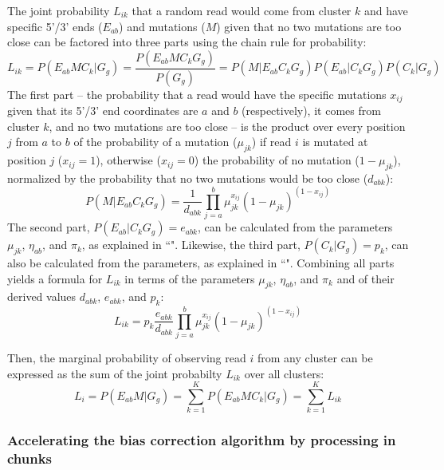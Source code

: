 \documentclass{article}
\begin{document}
The joint probability $L_{ik}$ that a random read would come from cluster $k$ and have specific 5'/3' ends ($E_{ab}$) and mutations ($M$) given that no two mutations are too close can be factored into three parts using the chain rule for probability:
\begin{equation}
    L_{ik} = P(E_{ab} M C_k | G_g) = \frac{P(E_{ab} M C_k G_g)}{P(G_g)} = P(M | E_{ab} C_k G_g) P(E_{ab} | C_k G_g) P(C_k | G_g)
\end{equation}
The first part -- the probability that a read would have the specific mutations $x_{ij}$ given that its 5'/3' end coordinates are $a$ and $b$ (respectively), it comes from cluster $k$, and no two mutations are too close -- is the product over every position $j$ from $a$ to $b$ of the probability of a mutation ($\mu_{jk}$) if read $i$ is mutated at position $j$ ($x_{ij} = 1$), otherwise ($x_{ij} = 0$) the probability of no mutation ($1 - \mu_{jk}$), normalized by the probability that no two mutations would be too close ($d_{abk}$):
\begin{equation}
    P(M | E_{ab} C_k G_g) = \frac{1}{d_{abk}} \prod_{j=a}^{b} \mu_{jk}^{x_{ij}} (1 - \mu_{jk})^{(1 - x_{ij})}
\end{equation}
The second part, $P(E_{ab} | C_k G_g) = e_{abk}$, can be calculated from the parameters $\mu_{jk}$, $\eta_{ab}$, and $\pi_k$, as explained in ``".
Likewise, the third part, $P(C_k | G_g) = p_k$, can also be calculated from the parameters, as explained in ``".
Combining all parts yields a formula for $L_{ik}$ in terms of the parameters $\mu_{jk}$, $\eta_{ab}$, and $\pi_k$ and of their derived values $d_{abk}$, $e_{abk}$, and $p_k$:
\begin{equation}
    L_{ik} = p_k \frac{e_{abk}}{d_{abk}} \prod_{j=a}^{b} \mu_{jk}^{x_{ij}} (1 - \mu_{jk})^{(1 - x_{ij})}
\end{equation}

Then, the marginal probability of observing read $i$ from any cluster can be expressed as the sum of the joint probabilty $L_{ik}$ over all clusters:
\begin{equation}
    L_i = P(E_{ab} M | G_g) = \sum_{k=1}^K P(E_{ab} M C_k | G_g) = \sum_{k=1}^K L_{ik}
\end{equation}

\subsubsection{Accelerating the bias correction algorithm by processing in chunks}
\end{document}

